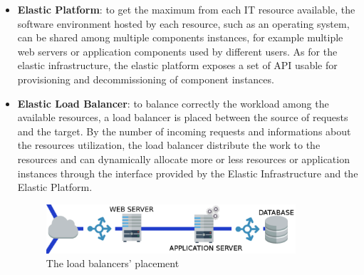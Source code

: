 \begin{itemize}
	\item \textbf{Elastic Platform}: to get the maximum from each IT resource available, the software environment hosted by each resource, such as an operating system, can be shared among multiple components instances, for example multiple web servers or application components used by different users. As for the elastic infrastructure, the elastic platform exposes a set of API usable for provisioning and decommissioning of component instances.
	\item \textbf{Elastic Load Balancer}: to balance correctly the workload among the available resources, a load balancer is placed between the source of requests and the target. By the number of incoming requests and informations about the resources utilization, the load balancer distribute the work to the resources and can dynamically allocate more or less resources or application instances through the interface provided by the Elastic Infrastructure and the Elastic Platform.
\begin{figure}[H]
	\centerline{
		\includegraphics[width=350px]{../Datas/images/loadbalancer.pdf}
	}
	\caption{The load balancers' placement}
	\label{fig: lb-placement}
\end{figure}
\end{itemize}
